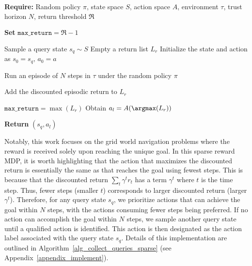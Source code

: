 \begin{algorithm}
\caption{Collecting Query States and Action Labels under Random Policy (MDP)}
\label{alg_collect_queries_dense}
\begin{algorithmic}[1]
%
		\STATE \textbf{Require:} Random policy $\pi$, state space $S$, action space $A$, environment $\tau$, trust horizon $N$, return threshold $\mathfrak{R}$

        \STATE \textbf{Set} $\texttt{max\_return} = \mathfrak{R} - 1$


            \STATE Sample a query state $s_q \sim S$
            \STATE Empty a return list $L_r$
                \STATE Initialize the state and action as $s_0 = s_q, \, a_0 = a$
            
                \STATE Run an episode of $N$ steps in $\tau$ under the random policy $\pi$
          
            \STATE Add the discounted episodic return to $L_r$

            \ENDFOR
            \STATE $\texttt{max\_return} = \max (L_r)$
        \ENDWHILE
            \STATE Obtain $a_l = A(\argmax (L_r))$

        \STATE \textbf{Return} $(s_q, a_l)$
%
\end{algorithmic}
\end{algorithm}






Notably, this work focuses on the grid world navigation problems where the reward is received solely upon reaching the unique goal. In this sparse reward MDP, it is worth highlighting that the action that maximizes the discounted return is essentially the same as that reaches the goal using fewest steps. This is because that the discounted return $\sum_t \gamma^t r_t$ has a term $\gamma^t$ where $t$ is the time step. Thus, fewer steps (smaller $t$) corresponds to larger discounted return (larger $\gamma^t$). Therefore, for any query state $s_q$, we prioritize actions that can achieve the goal within $N$ steps, with the actions consuming fewer steps being preferred. If no action can accomplish the goal within $N$ steps, we sample another query state until a qualified action is identified. This action is then designated as the action label associated with the query state $s_q$. Details of this implementation are outlined in Algorithm~\ref{alg_collect_queries_sparse} (see Appendix~\ref{appendix_implement}).





















